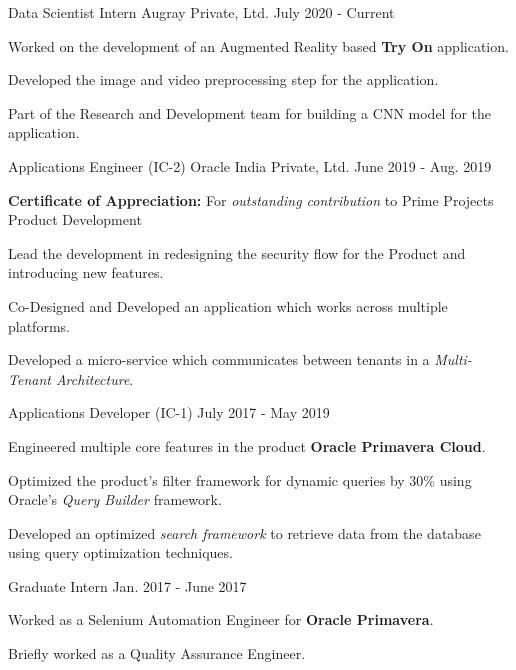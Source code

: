 \begin{cventries}
  \cventry
    {Data Scientist Intern}
    {Augray Private, Ltd.}
    {}
    {July 2020 - Current}
    {
      \begin{cvitems}
        \item {Worked on the development of an Augmented Reality based \textbf{Try On} application.}
        \item {Developed the image and video preprocessing step for the application.}
        \item {Part of the Research and Development team for building a CNN model for the application.}
      \end{cvitems}
    }
  \cventry
    {Applications Engineer (IC-2)}
    {Oracle India Private, Ltd.}
    {}
    {June 2019 - Aug. 2019}
    {
      \begin{cvitems}
        \item {\textbf{Certificate of Appreciation:} For \textit{outstanding contribution} to Prime Projects Product Development}
        \item {Lead the development in redesigning the security flow for the Product and introducing new features.}
        \item {Co-Designed and Developed an application which works across multiple platforms.}
        \item {Developed a micro-service which communicates between tenants in a \textit{Multi-Tenant Architecture}.}
      \end{cvitems}
    }
  \cvexperiencecontinued
    {Applications Developer (IC-1)}
    {}
    {July 2017 - May 2019}
    {
      \begin{cvitems}
        \item {Engineered multiple core features in the product \textbf{Oracle Primavera Cloud}.}
        \item {Optimized the product's filter framework for dynamic queries by 30\% using Oracle's \textit{Query Builder} framework.}
        \item {Developed an optimized \textit{search framework} to retrieve data from the database using query optimization techniques.}
      \end{cvitems}
    }
  \cvexperiencecontinued
    {Graduate Intern}
    {}
    {Jan. 2017 - June 2017}
    {
      \begin{cvitems}
        \item {Worked as a Selenium Automation Engineer for \textbf{Oracle Primavera}.}
        \item {Briefly worked as a Quality Assurance Engineer.}

\end{cvitems}}
\end{cventries}
